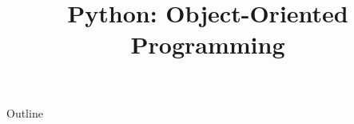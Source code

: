 \documentclass[xcolor=dvipsnames,compress,t,pdf]{beamer}
\title[\insertframenumber /\inserttotalframenumber]{Python: Object-Oriented Programming}
\begin{document}
	\begin{frame}
	\titlepage
	\end{frame}

	\begin{frame}{Outline}
	    \tableofcontents
	\end{frame}

	
	
	
\end{document}
